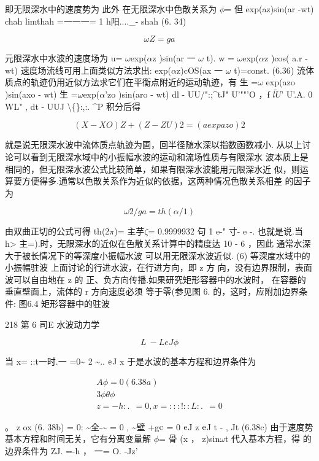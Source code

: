 即无限深水中的速度势为 此外 在无限深水中色散关系为 $\phi$= 但 exp(az)sin(ar -wt) chah limthah =一一一= 1 h阳....\_- shah (6. 34)

\begin{equation*}\omega Z=ga\tag{6.35}\end{equation*}

元限深水中水波的速度场为 u= $\omega$exp($\alpha$z )sin(ar 一 $\omega$ t). w = $\omega$exp($\alpha$z )cos( a.r - wt) 速度场流线可用上面类似方法求出: exp($\alpha$z)cOS(ax 一 $\omega$ t)=const. (6.36) 流体质点的轨迹仍用近似方法求它们在平衡点附近的运动轨迹，有 生 =$\omega$ exp(azo )sin(axo - wt) 生 =$\omega$exp($\alpha$'zo )sin(aro - wt) dl - UU/":;\textasciicircum{}tJ" U'""'O ，f $\tilde{lU}$' U'.A. 0 WL" , dt - UUJ \textbackslash\{\}:,:. \textasciicircum{}P 积分后得

\begin{equation*}(X-X O) Z +(Z-Z U)2 = (aexpaz o)2\tag{6.37}\end{equation*}

就是说无限深水波中流体质点轨迹为圃，回半径随水深以指数函数减小. 从以上讨论可以看到无限深水域中的小振幅水波的运动和流场性质与有限深水 波本质上是相同的，但无限深水波公式比较简单，如果有限深水波能用元限深水近 似，则运算要方便得多.通常以色散关系作为近似的依据，这两种情况色散关系相差 的因子为

\[\omega 2/ ga = th(\alpha /1)\]

由双曲正切的公式可得 th(2$\pi$)= 主芋$\zeta$= 0.9999932 句 1 e-" 寸- e -. 也就是说.当 h> 主=).时，无限深水的近似在色散关系计算中的精度达 10 - 6 ，因此 通常水深大于被长情况下的等深度小振幅水波 可以用无限深水波近似. (6) 等深度水域中的小振幅驻波 上面讨论的行进水波，在行进方向，即 z 方 向，没有边界限制，表面波可以自由地在 z 的 正、负方向传播.如果研究矩形容器中的水波时， 在容器的垂直壁面上，流体的 r 方向速度必须 等于零(参见图 6. 的，这时，应附加边界条件: 图6.4 矩形容器中的驻波

218 第 6 司E 水波动力学

\[L ~-L eJ \phi \]

当 x= ::t一时.一 =0\textasciitilde{} 2 \textasciitilde{}.. ${\rm e}$J x 于是水波的基本方程和边界条件为

\begin{gather*}
A\phi =0 (6. 38a)\\
3\phi \theta \phi \\
z = - h: .~ ~ = 0 , x =:::!:: L: .~ ~ = 0
\end{gather*}

。 z ox (6. 38b) = 0: \textasciitilde{}全-\textasciitilde{} = 0 , \textasciitilde{}壁 +g${\rm c}$ = 0 ${\rm e}$J z ${\rm e}$J t - , Jt (6.38c) 由于速度势基本方程和时间无关，它有分离变量解 $\phi$= 骨 (x ， z)sin$\omega$t 代入基本方程，得 的边界条件为 ZJ. =-h ， 一= O. -Jz'

